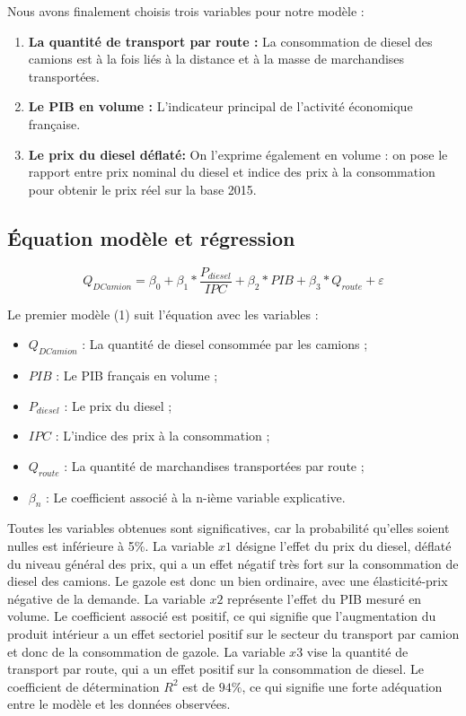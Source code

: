 \documentclass[
]{article}
\begin{document}
Nous avons finalement choisis trois variables pour notre modèle :

\begin{enumerate}
    \item \textbf{La quantité de transport par route :} La consommation de diesel des camions est à la fois liés à la distance et à la masse de marchandises transportées.
    \item \textbf{Le PIB en volume :} L'indicateur principal de l'activité économique française.
    \item \textbf{Le prix du diesel déflaté:} On l'exprime également en volume : on pose le rapport entre prix nominal du diesel et indice des prix à la consommation pour obtenir le prix réel sur la base 2015.
\end{enumerate}

\hypertarget{uxe9quation-moduxe8le-et-ruxe9gression}{%
\subsection{Équation modèle et
régression}\label{uxe9quation-moduxe8le-et-ruxe9gression}}

\begin{equation}
    \label{eq:modele1}
    Q_{DCamion} = \beta_0 + \beta_1*\frac{P_{diesel}}{IPC} +  \beta_2*PIB + \beta_3*Q_{route} + \varepsilon
\end{equation}

Le premier modèle (1) suit l'équation avec les variables :

\begin{itemize}
\item
  \(Q_{DCamion}\) : La quantité de diesel consommée par les camions ;
\item
  \(PIB\) : Le PIB français en volume ;
\item
  \(P_{diesel}\) : Le prix du diesel ;
\item
  \(IPC\) : L'indice des prix à la consommation ;
\item
  \(Q_{route}\) : La quantité de marchandises transportées par route ;
\item
  \(\beta_n\) : Le coefficient associé à la n-ième variable explicative.
\end{itemize}

Toutes les variables obtenues sont significatives, car la probabilité
qu'elles soient nulles est inférieure à 5\%. La variable \(x1\) désigne
l'effet du prix du diesel, déflaté du niveau général des prix, qui a un
effet négatif très fort sur la consommation de diesel des camions. Le
gazole est donc un bien ordinaire, avec une élasticité-prix négative de
la demande. La variable \(x2\) représente l'effet du PIB mesuré en
volume. Le coefficient associé est positif, ce qui signifie que
l'augmentation du produit intérieur a un effet sectoriel positif sur le
secteur du transport par camion et donc de la consommation de gazole. La
variable \(x3\) vise la quantité de transport par route, qui a un effet
positif sur la consommation de diesel. Le coefficient de détermination
\(R^2\) est de \(94\%\), ce qui signifie une forte adéquation entre le
modèle et les données observées.
\end{document}
